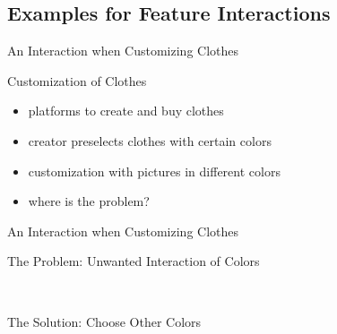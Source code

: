 \subsection{Examples for Feature Interactions}


\begin{frame}{An Interaction when Customizing Clothes}
	\begin{fancycolumns}[widths={33},animation=none]
		\begin{example}{Customization of Clothes}
			\begin{itemize}
			\item platforms to create and buy clothes
			\item creator preselects clothes with certain colors
			\item customization with pictures in different colors
			\item where is the problem?
			\end{itemize}
		\end{example}
	\nextcolumn
	\end{fancycolumns}
\end{frame}
\begin{frame}{An Interaction when Customizing Clothes}
	\begin{fancycolumns}
		\begin{exampletight}{The Problem: Unwanted Interaction of Colors}
			~

			\centering{}

			~
		\end{exampletight}
	\nextcolumn
		\begin{exampletight}{The Solution: Choose Other Colors}
			~

			\centering{}

			~
		\end{exampletight}
	\end{fancycolumns}
\end{frame}
